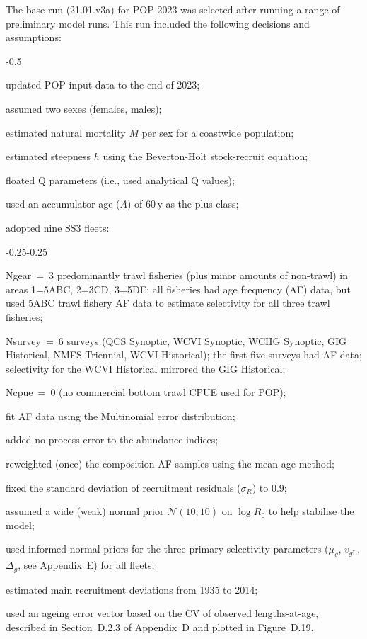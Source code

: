 \documentclass[11pt]{book}
\newcommand{\AppBio}{Appendix~D}
\newcommand{\AppEqn}{Appendix~E}
\begin{document}
\renewcommand{\startYear}{1935} %
\renewcommand{\currYear}{2024}   %
\renewcommand{\prevYear}{2023}   %
\renewcommand{\projYear}{2034}   %
\renewcommand{\pgenYear}{75}   %


The base run (21.01.v3a) for POP 2023 was selected after running a range of preliminary model runs.
This run included the following decisions and assumptions:
\begin{itemize_csas}{-0.5}{}
	\item updated POP input data to the end of 2023;
	\item assumed two sexes (females, males);
	\item estimated natural mortality $M$ per sex for a coastwide population;
	\item estimated steepness $h$ using the Beverton-Holt stock-recruit equation;
	\item floated Q parameters (i.e., used analytical Q values);
	\item used an accumulator age ($A$) of 60\,y as the plus class;
	\item adopted nine SS3 fleets:
	\begin{itemize_csas}{-0.25}{-0.25}
		\item Ngear~=~3 predominantly trawl fisheries (plus minor amounts of non-trawl) in areas 1=5ABC, 2=3CD, 3=5DE;
			all fisheries had age frequency (AF) data, but\\
			used 5ABC trawl fishery AF data to estimate selectivity for all three trawl fisheries;
		\item Nsurvey~=~6 surveys (QCS Synoptic, WCVI Synoptic, WCHG Synoptic, GIG Historical, NMFS Triennial, WCVI Historical);
			the first five surveys had AF data;\\
			selectivity for the WCVI Historical mirrored the GIG Historical;
		\item Ncpue~=~0 (no commercial bottom trawl CPUE used for POP);
	\end{itemize_csas}
	\item fit AF data using the Multinomial error distribution;
	\item added no process error to the abundance indices;
	\item reweighted (once) the composition AF samples using the \citet{Francis:2011} mean-age method;
	\item fixed the standard deviation of recruitment residuals ($\sigma_R$) to 0.9;
  \item assumed a wide (weak) normal prior $\mathcal{N}(10,10)$ on $\log R_0$ to help stabilise the model; 
  \item used informed normal priors for the three primary selectivity parameters ($\mu_g$, $v_{g\text{L}}$, $\Delta_{g}$, see \AppEqn) for all fleets;
  \item estimated main recruitment deviations from 1935 to 2014;
  \item used an ageing error vector based on the CV of observed lengths-at-age, described in Section~D.2.3 of \AppBio{} and plotted in Figure~D.19.
\end{itemize_csas}
\end{document}
